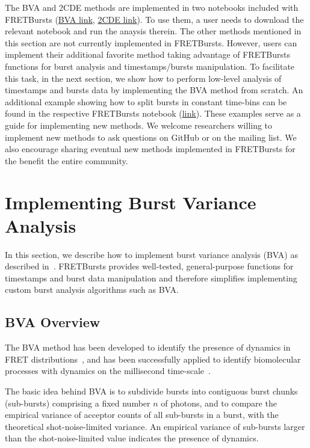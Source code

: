 \documentclass[10pt,letterpaper]{article}
\begin{document}
The BVA and 2CDE methods are implemented 
in two notebooks included with FRETBursts
(\href{http://nbviewer.jupyter.org/github/tritemio/FRETBursts_notebooks/blob/master/notebooks/Example%20-%20Burst%20Variance%20Analysis.ipynb}{BVA link},
\href{http://nbviewer.jupyter.org/github/tritemio/FRETBursts_notebooks/blob/master/notebooks/Example%20-%202CDE%20Method.ipynb}{2CDE link}).
To use them, a user needs to download the relevant notebook
and run the anaysis therein.
The other methods mentioned in this section are not currently 
implemented in FRETBursts.
However, users can implement their additional favorite method
taking advantage of FRETBursts functions for burst analysis
and timestamps/bursts manipulation.
To facilitate this task, in the next section,
we show how to perform low-level analysis of timestamps and bursts data 
by implementing the BVA method from scratch.
An additional example showing how to split bursts in constant time-bins
can be found in the respective FRETBursts notebook
(\href{http://nbviewer.jupyter.org/github/tritemio/FRETBursts_notebooks/blob/master/notebooks/Example%20-%20Working%20with%20timestamps%20and%20bursts.ipynb}{link}).
These examples serve as a guide for implementing new methods.
We welcome researchers willing to implement new methods to ask questions
on GitHub or on the mailing list. 
We also encourage sharing eventual new methods implemented in FRETBursts 
for the benefit the entire community.


\section*{Implementing Burst Variance Analysis}

\label{sec:bva}
In this section, we describe how to implement burst variance analysis (BVA)
as described in~\cite{Torella_2011}.
FRETBursts provides well-tested, general-purpose functions for timestamps and burst data
manipulation and therefore simplifies implementing custom burst analysis algorithms such as BVA.

\subsection*{BVA Overview}
The BVA method has been developed to identify the presence of dynamics
in FRET distributions~\cite{Torella_2011},
and has been successfully applied to identify biomolecular processes with
dynamics on the millisecond time-scale~\cite{Torella_2011, Robb_2013}.

The basic idea behind BVA is to subdivide bursts into contiguous burst chunks (sub-bursts)
comprising a fixed number $n$ of photons,
and to compare the empirical variance of acceptor counts of all sub-bursts in a burst,
with the theoretical shot-noise-limited variance.
An empirical variance of sub-bursts larger than the shot-noise-limited value indicates
the presence of dynamics. 
\end{document}
